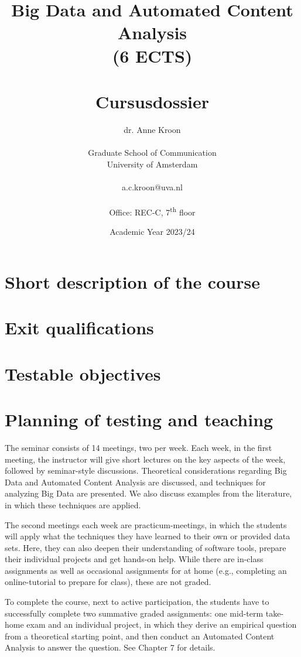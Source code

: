 \documentclass[a4paper,12pt]{report}
\title{Big Data and Automated Content Analysis\\ (6 ECTS)\\~\\Cursusdossier}
\author{dr. Anne Kroon\\~\\Graduate School of Communication\\University of Amsterdam\\~\\a.c.kroon@uva.nl\\~\\Office: REC-C, 7\textsuperscript{th} floor}
\date{Academic Year 2023/24}
\begin{document}
\maketitle

\tableofcontents


\chapter{Short description of the course}



\chapter{Exit qualifications}


\chapter{Testable objectives}


\chapter{Planning of testing and teaching}

The seminar consists of 14 meetings, two per week. Each week, in the first meeting, the instructor will give short lectures on the key aspects of the week, followed by seminar-style discussions. Theoretical considerations regarding Big Data and Automated Content Analysis are discussed, and techniques for analyzing Big Data are presented. We also discuss examples from the literature, in which these techniques are applied.


The second meetings each week are practicum-meetings, in which the students will apply what the techniques they have learned to their own or provided data sets. Here, they can also deepen their understanding of software tools, prepare their individual projects and get hands-on help. While there are in-class assignments as well as occasional assignments for at home (e.g., completing an online-tutorial to prepare for class), these are not graded.

To complete the course, next to active participation, the students have to successfully complete two summative graded assignments: one mid-term take-home exam and an individual project, in which they derive an empirical question from a theoretical starting point, and then conduct an Automated Content Analysis to answer the question. See Chapter 7 for details.
\end{document}
